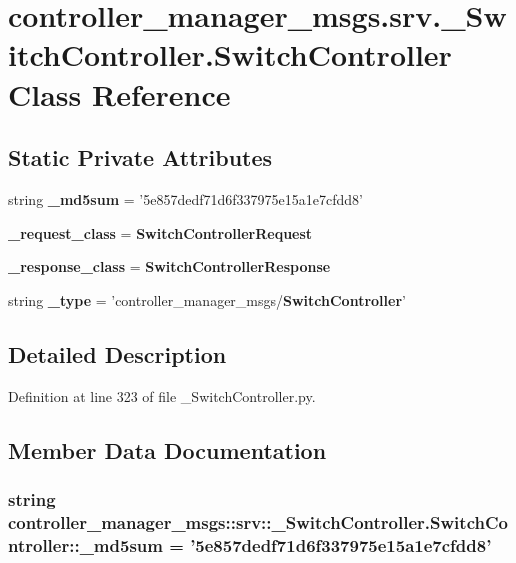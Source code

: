 \section{controller\-\_\-manager\-\_\-msgs.\-srv.\-\_\-\-Switch\-Controller.\-Switch\-Controller \-Class \-Reference}
\label{classcontroller__manager__msgs_1_1srv_1_1__SwitchController_1_1SwitchController}
\subsection*{\-Static \-Private \-Attributes}
\begin{DoxyCompactItemize}
\item 
string {\bf \-\_\-md5sum} = '5e857dedf71d6f337975e15a1e7cfdd8'
\item 
{\bf \-\_\-request\-\_\-class} = {\bf \-Switch\-Controller\-Request}
\item 
{\bf \-\_\-response\-\_\-class} = {\bf \-Switch\-Controller\-Response}
\item 
string {\bf \-\_\-type} = 'controller\-\_\-manager\-\_\-msgs/{\bf \-Switch\-Controller}'
\end{DoxyCompactItemize}


\subsection{\-Detailed \-Description}


\-Definition at line 323 of file \-\_\-\-Switch\-Controller.\-py.



\subsection{\-Member \-Data \-Documentation}
\subsubsection[{\-\_\-md5sum}]{\setlength{\rightskip}{0pt plus 5cm}string {\bf controller\-\_\-manager\-\_\-msgs\-::srv\-::\-\_\-\-Switch\-Controller.\-Switch\-Controller\-::\-\_\-md5sum} = '5e857dedf71d6f337975e15a1e7cfdd8'\hspace{0.3cm}{\ttfamily  [static, private]}}\label{classcontroller__manager__msgs_1_1srv_1_1__SwitchController_1_1SwitchController_a1743dcf690e20e05980dc5712a00c5f0}


